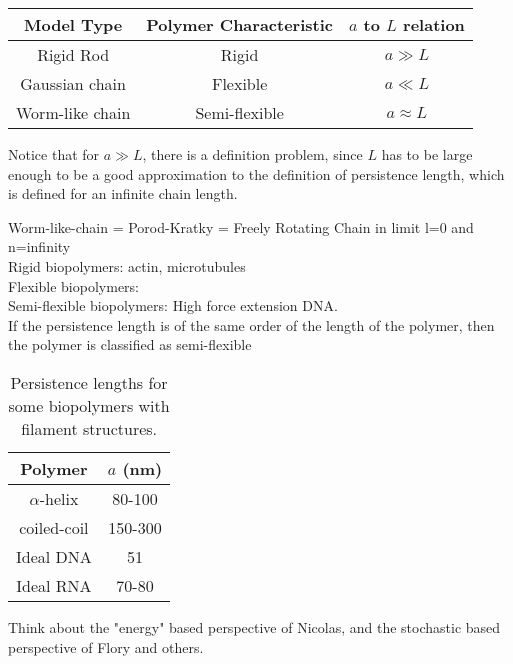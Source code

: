 \begin{table}[htbp]
\begin{center}  
\begin{tabular}{c|c|c}
\hline
Model Type      & Polymer Characteristic & $a$ to $L$ relation\\ \hline
Rigid Rod       & Rigid          &        $a \gg L$   \\
Gaussian chain  & Flexible       &        $a \ll L$   \\
Worm-like chain & Semi-flexible  &    $a \approx L$ \\
\hline
\end{tabular}
\end{center}
\end{table}
Notice that for $a \gg L$, there is a definition problem, since $L$
has to be large enough to be a good approximation to the definition of
persistence length, which is defined for an infinite chain length.





Worm-like-chain = Porod-Kratky = Freely Rotating Chain in limit l=0
and n=infinity
\\

Rigid biopolymers:
actin, microtubules
\\

Flexible biopolymers:
\\

Semi-flexible biopolymers:
High force extension DNA.
\\

If the persistence length is of the same order of the length of the
polymer, then the polymer is classified as  semi-flexible


\begin{table}[htbp]
\begin{center}  
\begin{tabular}{c|c}
\hline
Polymer       & $a$ (nm)   \\ \hline
$\alpha$-helix & 80-100\\
coiled-coil & 150-300\\
Ideal DNA  &  51  \\
Ideal RNA & 70-80 \\
\hline
\end{tabular}
\caption{Persistence lengths for some biopolymers with filament structures.}
\end{center}
\end{table}

Think about the "energy" based perspective of Nicolas, and the
stochastic based perspective of Flory and others.

